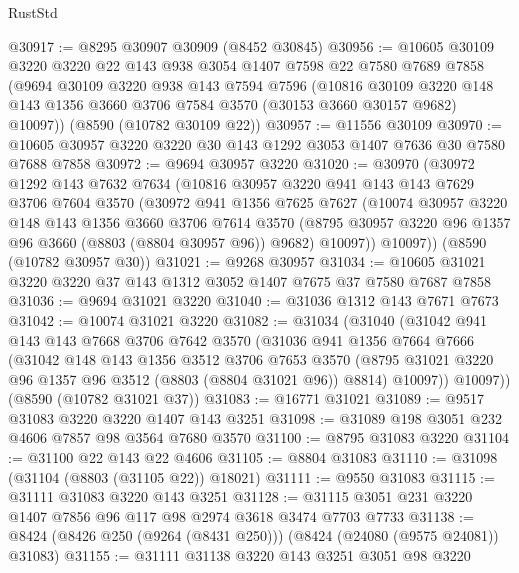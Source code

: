\begin{lexlean}{RustStd}
\begin{coremodule}
@30917 := @8295 @30907 @30909 (@8452 @30845)
@30956 := @10605
    @30109
    @3220
    @3220
    @22
    @143
    @938
    @3054
    @1407
    @7598
    @22
    @7580
    @7689
    @7858
    (@9694
      @30109
      @3220
      @938
      @143
      @7594
      @7596
      (@10816
        @30109
        @3220
        @148
        @143
        @1356
        @3660
        @3706
        @7584
        @3570
        (@30153 @3660 @30157 @9682)
        @10097))
    (@8590 (@10782 @30109 @22))
@30957 := @11556 @30109
@30970 := @10605 @30957 @3220 @3220 @30 @143 @1292 @3053 @1407 @7636 @30 @7580 @7688 @7858
@30972 := @9694 @30957 @3220
@31020 := @30970
    (@30972
      @1292
      @143
      @7632
      @7634
      (@10816
        @30957
        @3220
        @941
        @143
        @143
        @7629
        @3706
        @7604
        @3570
        (@30972
          @941
          @1356
          @7625
          @7627
          (@10074
            @30957
            @3220
            @148
            @143
            @1356
            @3660
            @3706
            @7614
            @3570
            (@8795 @30957 @3220 @96 @1357 @96 @3660 (@8803 (@8804 @30957 @96)) @9682)
            @10097))
        @10097))
    (@8590 (@10782 @30957 @30))
@31021 := @9268 @30957
@31034 := @10605 @31021 @3220 @3220 @37 @143 @1312 @3052 @1407 @7675 @37 @7580 @7687 @7858
@31036 := @9694 @31021 @3220
@31040 := @31036 @1312 @143 @7671 @7673
@31042 := @10074 @31021 @3220
@31082 := @31034
    (@31040
      (@31042
        @941
        @143
        @143
        @7668
        @3706
        @7642
        @3570
        (@31036
          @941
          @1356
          @7664
          @7666
          (@31042
            @148
            @143
            @1356
            @3512
            @3706
            @7653
            @3570
            (@8795 @31021 @3220 @96 @1357 @96 @3512 (@8803 (@8804 @31021 @96)) @8814)
            @10097))
        @10097))
    (@8590 (@10782 @31021 @37))
@31083 := @16771 @31021
@31089 := @9517 @31083 @3220 @3220 @1407 @143 @3251
@31098 := @31089 @198 @3051 @232 @4606 @7857 @98 @3564 @7680 @3570
@31100 := @8795 @31083 @3220
@31104 := @31100 @22 @143 @22 @4606
@31105 := @8804 @31083
@31110 := @31098 (@31104 (@8803 (@31105 @22)) @18021)
@31111 := @9550 @31083
@31115 := @31111 @31083 @3220 @143 @3251
@31128 := @31115 @3051 @231 @3220 @1407 @7856 @96 @117 @98 @2974 @3618 @3474 @7703 @7733
@31138 := @8424 (@8426 @250 (@9264 (@8431 @250))) (@8424 (@24080 (@9575 @24081)) @31083)
@31155 := @31111
    @31138
    @3220
    @143
    @3251
    @3051
    @98
    @3220

\end{coremodule}
\end{lexlean}
